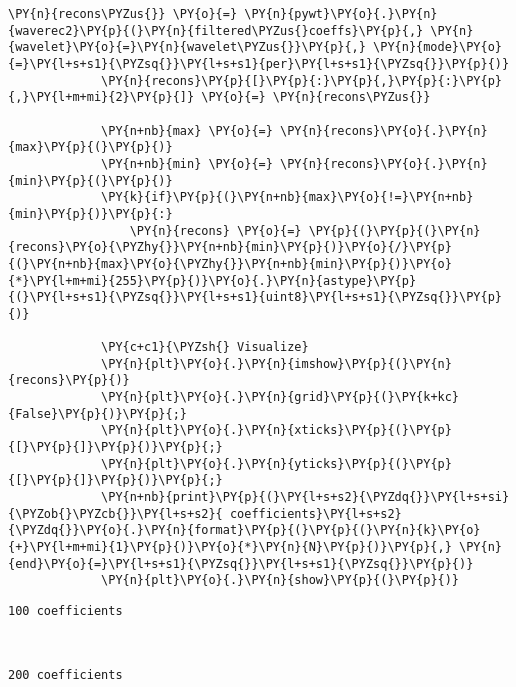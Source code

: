 \begin{Verbatim}[commandchars=\\\{\}]
             \PY{n}{recons\PYZus{}} \PY{o}{=} \PY{n}{pywt}\PY{o}{.}\PY{n}{waverec2}\PY{p}{(}\PY{n}{filtered\PYZus{}coeffs}\PY{p}{,} \PY{n}{wavelet}\PY{o}{=}\PY{n}{wavelet\PYZus{}}\PY{p}{,} \PY{n}{mode}\PY{o}{=}\PY{l+s+s1}{\PYZsq{}}\PY{l+s+s1}{per}\PY{l+s+s1}{\PYZsq{}}\PY{p}{)}
             \PY{n}{recons}\PY{p}{[}\PY{p}{:}\PY{p}{,}\PY{p}{:}\PY{p}{,}\PY{l+m+mi}{2}\PY{p}{]} \PY{o}{=} \PY{n}{recons\PYZus{}}
                               
             \PY{n+nb}{max} \PY{o}{=} \PY{n}{recons}\PY{o}{.}\PY{n}{max}\PY{p}{(}\PY{p}{)}
             \PY{n+nb}{min} \PY{o}{=} \PY{n}{recons}\PY{o}{.}\PY{n}{min}\PY{p}{(}\PY{p}{)}
             \PY{k}{if}\PY{p}{(}\PY{n+nb}{max}\PY{o}{!=}\PY{n+nb}{min}\PY{p}{)}\PY{p}{:}
                 \PY{n}{recons} \PY{o}{=} \PY{p}{(}\PY{p}{(}\PY{n}{recons}\PY{o}{\PYZhy{}}\PY{n+nb}{min}\PY{p}{)}\PY{o}{/}\PY{p}{(}\PY{n+nb}{max}\PY{o}{\PYZhy{}}\PY{n+nb}{min}\PY{p}{)}\PY{o}{*}\PY{l+m+mi}{255}\PY{p}{)}\PY{o}{.}\PY{n}{astype}\PY{p}{(}\PY{l+s+s1}{\PYZsq{}}\PY{l+s+s1}{uint8}\PY{l+s+s1}{\PYZsq{}}\PY{p}{)}
         
             \PY{c+c1}{\PYZsh{} Visualize}
             \PY{n}{plt}\PY{o}{.}\PY{n}{imshow}\PY{p}{(}\PY{n}{recons}\PY{p}{)}
             \PY{n}{plt}\PY{o}{.}\PY{n}{grid}\PY{p}{(}\PY{k+kc}{False}\PY{p}{)}\PY{p}{;}
             \PY{n}{plt}\PY{o}{.}\PY{n}{xticks}\PY{p}{(}\PY{p}{[}\PY{p}{]}\PY{p}{)}\PY{p}{;}
             \PY{n}{plt}\PY{o}{.}\PY{n}{yticks}\PY{p}{(}\PY{p}{[}\PY{p}{]}\PY{p}{)}\PY{p}{;}
             \PY{n+nb}{print}\PY{p}{(}\PY{l+s+s2}{\PYZdq{}}\PY{l+s+si}{\PYZob{}\PYZcb{}}\PY{l+s+s2}{ coefficients}\PY{l+s+s2}{\PYZdq{}}\PY{o}{.}\PY{n}{format}\PY{p}{(}\PY{p}{(}\PY{n}{k}\PY{o}{+}\PY{l+m+mi}{1}\PY{p}{)}\PY{o}{*}\PY{n}{N}\PY{p}{)}\PY{p}{,} \PY{n}{end}\PY{o}{=}\PY{l+s+s1}{\PYZsq{}}\PY{l+s+s1}{\PYZsq{}}\PY{p}{)}
             \PY{n}{plt}\PY{o}{.}\PY{n}{show}\PY{p}{(}\PY{p}{)}
\end{Verbatim}


    \begin{Verbatim}[commandchars=\\\{\}]
100 coefficients
    \end{Verbatim}

    \begin{center}
    \end{center}
    { \hspace*{\fill} \\}
    
    \begin{Verbatim}[commandchars=\\\{\}]
200 coefficients
    \end{Verbatim}

